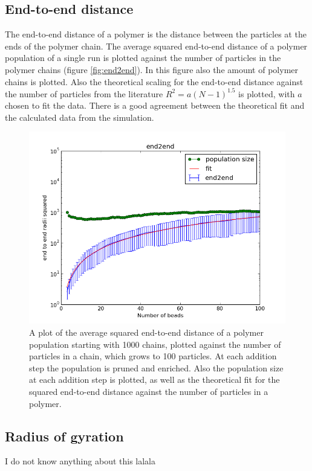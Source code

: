 \documentclass{article}
\begin{document}
\begin{multicols}{2}
\subsection*{End-to-end distance}
The end-to-end distance of a polymer is the distance between the particles at the ends of the polymer chain. The average squared end-to-end distance of a polymer population of a single run is plotted against the number of particles in the polymer chains (figure \ref{fig:end2end}). In this figure also the amount of polymer chains is plotted. Also the theoretical scaling for the end-to-end distance against the number of particles from the literature $R^2=a(N-1)^{1.5}$ \cite{Jos}  is plotted, with $a$ chosen to fit the data. There is a good agreement between the theoretical fit and the calculated data from the simulation.
 \begin{figure}[ht]
\centering
\includegraphics[width=\textwidth]{betereplot.png}
\caption{A plot of the average squared end-to-end distance of a polymer population starting with 1000 chains, plotted against the number of particles in a chain, which grows to 100 particles. At each addition step the population is pruned and enriched. Also the population size at each addition step is plotted, as well as the theoretical fit for the squared end-to-end distance against the number of particles in a polymer. }
 \label{fig:polymers}
\end{figure} 
\subsection*{Radius of gyration}
{\color{blue} I do not know anything about this lalala}


\end{multicols}
\end{document}
